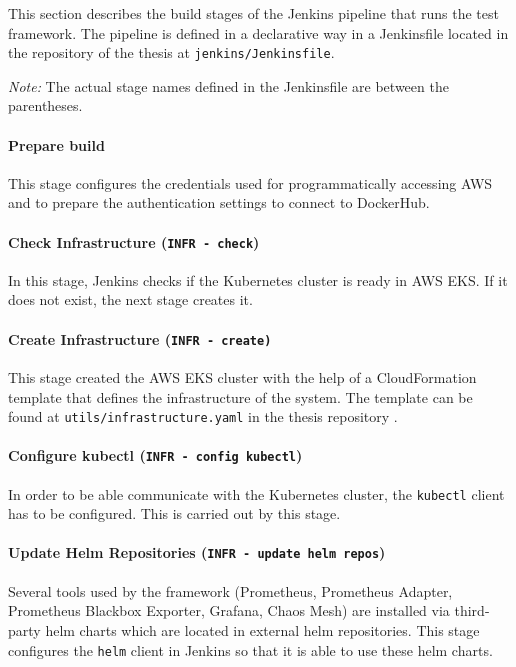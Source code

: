 This section describes the build stages of the Jenkins pipeline that runs the test framework. The pipeline is defined in a declarative way in a Jenkinsfile located in the repository of the thesis \cite{ThesisRepo} at \texttt{jenkins/Jenkinsfile}.

\emph{Note:} The actual stage names defined in the Jenkinsfile are between the parentheses.

\paragraph{Prepare build} This stage configures the credentials used for programmatically accessing AWS and to prepare the authentication settings to connect to DockerHub.

\paragraph{Check Infrastructure (\texttt{INFR - check})} In this stage, Jenkins checks if the Kubernetes cluster is ready in AWS EKS. If it does not exist, the next stage creates it.

\paragraph{Create Infrastructure (\texttt{INFR - create)}} This stage created the AWS EKS cluster with the help of a CloudFormation template that defines the infrastructure of the system. The template can be found at \texttt{utils/infrastructure.yaml} in the thesis repository \cite{ThesisRepo}.

\paragraph{Configure kubectl (\texttt{INFR - config kubectl})} In order to be able communicate with the Kubernetes cluster, the \texttt{kubectl} client has to be configured. This is carried out by this stage.

\paragraph{Update Helm Repositories (\texttt{INFR - update helm repos})} Several tools used by the framework (Prometheus, Prometheus Adapter, Prometheus Blackbox Exporter, Grafana, Chaos Mesh) are installed via third-party helm charts which are located in external helm repositories. This stage configures the \texttt{helm} client in Jenkins so that it is able to use these helm charts.

